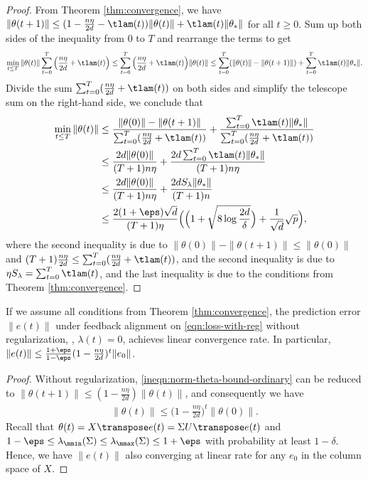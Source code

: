 \begin{proof}
    From Theorem \ref{thm:convergence}, we have $\|\theta(t+1)\| \leq (1-\frac{n\eta}{2d}-\tlam(t))\|\theta(t)\| + \tlam(t)\|\theta_\ast\|$ for all $t\geq 0$. Sum up both sides of the inequality from $0$ to $T$ and rearrange the terms to get
    \begin{align*}
        \min_{t\leq T} \|\theta(t)\|\sum_{t=0}^T \Big(\frac{n\eta}{2d}+\tlam(t)\Big) \leq \sum_{t=0}^T \Big(\frac{n\eta}{2d}+\tlam(t)\Big)\|\theta(t)\| \leq \sum_{t=0}^T (\|\theta(t)\|- \|\theta(t+1)\|) + \sum_{t=0}^T \tlam(t)\|\theta_\ast\|.
    \end{align*}
    Divide the sum $\sum_{t=0}^T (\frac{n\eta}{2d}+\tlam(t))$ on both sides and simplify the telescope sum on the right-hand side, we conclude that
    \begin{align*}
        \min_{t\leq T}\|\theta(t)\| & \leq \frac{\|\theta(0)\| - \|\theta(t+1)\|}{\sum_{t=0}^T (\frac{n\eta}{2d}+\tlam(t))} + \frac{\sum_{t=0}^T \tlam(t)\|\theta_\ast\|}{\sum_{t=0}^T (\frac{n\eta}{2d}+\tlam(t))} \\
        & \leq \frac{2d\|\theta(0)\|}{(T+1)n\eta} + \frac{2d\sum_{t=0}^T \tlam(t)\|\theta_\ast\|}{(T+1)n\eta} \\
        & \leq \frac{2d\|\theta(0)\|}{(T+1)n\eta} + \frac{2d S_\lambda\|\theta_\ast\|}{(T+1)n} \\
        & \leq \frac{2(1+\eps)\sqrt{d}}{(T+1)\eta} \Big( \Big(1 + \sqrt{8\log\frac{2d}{\delta}}\Big) + \frac{1}{\sqrt{d}}\sqrt{p} \Big),
    \end{align*}
    where the second inequality is due to $\|\theta(0)\| - \|\theta(t+1)\| \leq \|\theta(0)\|$ and $(T+1)\frac{n\eta}{2d} \leq \sum_{t=0}^T (\frac{n\eta}{2d}+\tlam(t))$, and the second inequality is due to $\eta S_\lambda = \sum_{t=0}^T \tlam(t)$, and the last inequality is due to the conditions from Theorem \ref{thm:convergence}.
\end{proof}

\begin{corollary}\label{cor:convergence-without-reg}
    If we assume all conditions from Theorem \ref{thm:convergence}, the prediction error $\|e(t)\|$ under feedback alignment on \eqref{eqn:loss-with-reg} without regularization, \ie, $\lambda(t) = 0$, achieves linear convergence rate. In particular, $\|e(t)\| \leq \frac{1+\eps}{1-\eps}(1-\frac{n\eta}{2d})^t \|e_0\|$.
\end{corollary}

\begin{proof}
    Without regularization, \cref{ineqn:norm-theta-bound-ordinary} can be reduced to $\|\theta(t+1)\| \leq (1-\frac{n\eta}{2d}) \|\theta(t)\|$, and consequently we have
    \begin{align*}
        \|\theta(t)\| \leq \Big(1-\frac{n\eta}{2d}\Big)^t \|\theta(0)\|.
    \end{align*}
    Recall that $\theta(t) = X\transpose e(t) = \Sigma U\transpose e(t)$ and $1-\eps\leq \lambda_\mmin(\Sigma)\leq \lambda_\mmax(\Sigma)\leq 1+\eps$ with probability at least $1-\delta$. Hence, we have $\|e(t)\|$ also converging at linear rate for any $e_0$ in the column space of $X$.
\end{proof}

